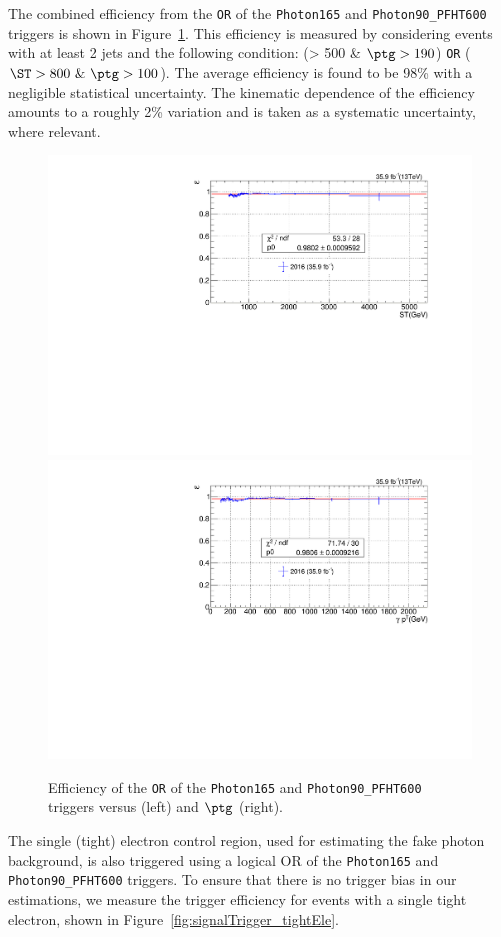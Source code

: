The combined efficiency from the \texttt{OR} of the \texttt{Photon165} and 
\texttt{Photon90\_PFHT600} 
triggers is shown in Figure~\ref{fig:signalTriggers_OR}. This efficiency is measured by considering events with at least 2 jets and the following condition: (\ST > 500 \& $\ptg>190$) \texttt{OR} ($\ST > 800\ \& \ \ptg>100$).  The average efficiency
is found to be 98\% with a negligible statistical uncertainty.  The kinematic
dependence of the efficiency amounts to a roughly 2\% variation and is taken
as a systematic uncertainty, where relevant.

\begin{figure}[htbp!]
  \centering
  \includegraphics[width=0.48\linewidth]{../Figures/Chap3/triggers/signalTriggerEff_ST.pdf}
  \includegraphics[width=0.48\linewidth]{../Figures/Chap3/triggers/signalTriggerEff_photonPt.pdf}
  \captionsetup{width=.9\linewidth}
  \caption[Efficiency for SR triggers]{Efficiency of the \texttt{OR} of the \texttt{Photon165} and \texttt{Photon90\_PFHT600} triggers versus \ST (left) and $\ptg$ (right).}
  \label{fig:signalTriggers_OR}
\end{figure}

The single (tight) electron control region, used for estimating the fake photon background, 
is also triggered using a logical OR of the \texttt{Photon165} and \texttt{Photon90\_PFHT600}
triggers. To ensure that there is no trigger bias in our estimations, we measure
the trigger efficiency for events with a single tight electron, shown in Figure~\ref{fig:signalTrigger_tightEle}.


